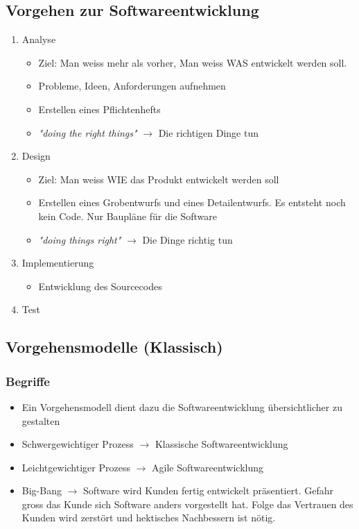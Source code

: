 \subsection{Vorgehen zur Softwareentwicklung}
	\begin{enumerate}
		\item Analyse
			\begin{itemize}
				\item Ziel: Man weiss mehr als vorher, Man weiss WAS entwickelt werden soll.
				\item Probleme, Ideen, Anforderungen aufnehmen
				\item Erstellen eines Pflichtenhefts
				\item \textit{"doing the right things"} $\rightarrow$ Die richtigen Dinge tun
			\end{itemize}
		\item Design
			\begin{itemize}
				\item Ziel: Man weiss WIE das Produkt entwickelt werden soll
				\item Erstellen eines Grobentwurfs und eines Detailentwurfs. Es entsteht noch kein Code. Nur Baupläne für die Software
				\item \textit{"doing things right"} $\rightarrow$ Die Dinge richtig tun
			\end{itemize}
		\item Implementierung
			\begin{itemize}
				\item Entwicklung des Sourcecodes 
			\end{itemize}
		\item Test 
	\end{enumerate}
\pagebreak

\subsection{Vorgehensmodelle (Klassisch)}
\subsubsection{Begriffe}
\begin{itemize}
	\item Ein Vorgehensmodell dient dazu die Softwareentwicklung übersichtlicher zu gestalten
	\item Schwergewichtiger Prozess $\rightarrow$ Klassische Softwareentwicklung
	\item Leichtgewichtiger Prozess $\rightarrow$ Agile Softwareentwicklung
	\item Big-Bang $\rightarrow$ Software wird Kunden fertig entwickelt präsentiert. Gefahr gross das Kunde sich Software anders vorgestellt hat. Folge das Vertrauen des Kunden wird zerstört und hektisches Nachbessern ist nötig. 
\end{itemize}

